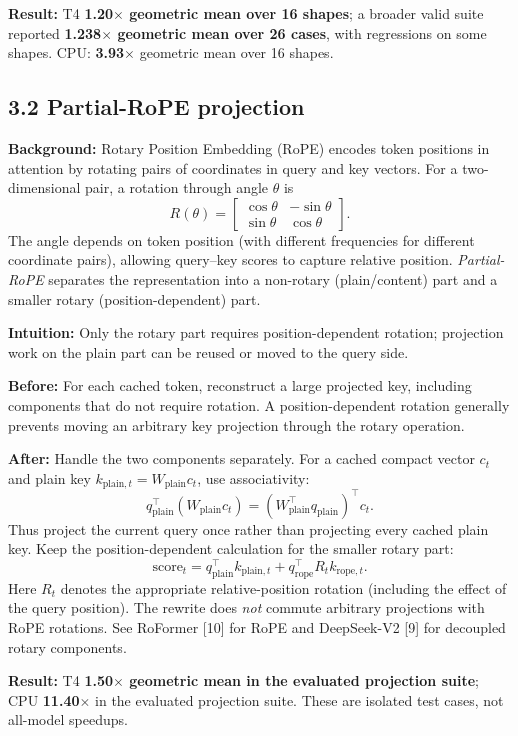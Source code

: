 \documentclass[10pt,a4paper]{article}
\begin{document}
\textbf{Result:} T4 \textbf{1.20$\times$ geometric mean over 16 shapes}; a broader valid suite reported \textbf{1.238$\times$ geometric mean over 26 cases}, with regressions on some shapes. CPU: \textbf{3.93$\times$} geometric mean over 16 shapes.
\vspace{-0.5cm}
\subsection*{3.2 Partial-RoPE projection}
\textbf{Background:} Rotary Position Embedding (RoPE) encodes token positions in attention by rotating pairs of coordinates in query and key vectors. For a two-dimensional pair, a rotation through angle $\theta$ is
\[
R(\theta)=\begin{bmatrix}\cos\theta&-\sin\theta\\ \sin\theta&\cos\theta\end{bmatrix}.
\]
The angle depends on token position (with different frequencies for different coordinate pairs), allowing query--key scores to capture relative position. \emph{Partial-RoPE} separates the representation into a non-rotary (plain/content) part and a smaller rotary (position-dependent) part.

\textbf{Intuition:} Only the rotary part requires position-dependent rotation; projection work on the plain part can be reused or moved to the query side.

\textbf{Before:} For each cached token, reconstruct a large projected key, including components that do not require rotation. A position-dependent rotation generally prevents moving an arbitrary key projection through the rotary operation.

\textbf{After:} Handle the two components separately. For a cached compact vector $c_t$ and plain key $k_{\mathrm{plain},t}=W_{\mathrm{plain}}c_t$, use associativity:
\[
q_{\mathrm{plain}}^\top (W_{\mathrm{plain}}c_t)
=(W_{\mathrm{plain}}^\top q_{\mathrm{plain}})^\top c_t.
\]
Thus project the current query once rather than projecting every cached plain key. Keep the position-dependent calculation for the smaller rotary part:
\[
\mathrm{score}_t = q_{\mathrm{plain}}^\top k_{\mathrm{plain},t}
+q_{\mathrm{rope}}^\top R_t k_{\mathrm{rope},t}.
\]
Here $R_t$ denotes the appropriate relative-position rotation (including the effect of the query position). The rewrite does \emph{not} commute arbitrary projections with RoPE rotations. See RoFormer [10] for RoPE and DeepSeek-V2 [9] for decoupled rotary components.

\textbf{Result:} T4 \textbf{1.50$\times$ geometric mean in the evaluated projection suite}; CPU \textbf{11.40$\times$} in the evaluated projection suite. These are isolated test cases, not all-model speedups.
\vspace{-0.5cm}
\end{document}

